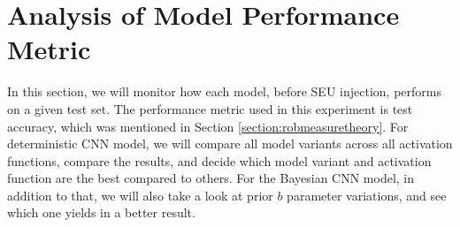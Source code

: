 \documentclass[ %
                    author={Revalda Putawara},
                supervisor={Dr. James Pope},
                    degree={MSc},
                     title={Robustness of Bayesian Neural Networks Design Choices Against Weight and Bias Perturbation Induced by Single Event Upsets (SEUs)},
                      type={},
                      year={2025}]{dissertation}
\begin{document}

\section{Analysis of Model Performance Metric}


In this section, we will monitor how each model, before SEU injection, performs on a given test set. The performance metric used in this experiment is test accuracy, which was mentioned in Section \ref{section:robmeasuretheory}. For deterministic CNN model, we will compare all model variants across all activation functions, compare the results, and decide which model variant and activation function are the best compared to others. For the Bayesian CNN model, in addition to that, we will also take a look at prior $b$ parameter variations, and see which one yields in a better result.
\end{document}
